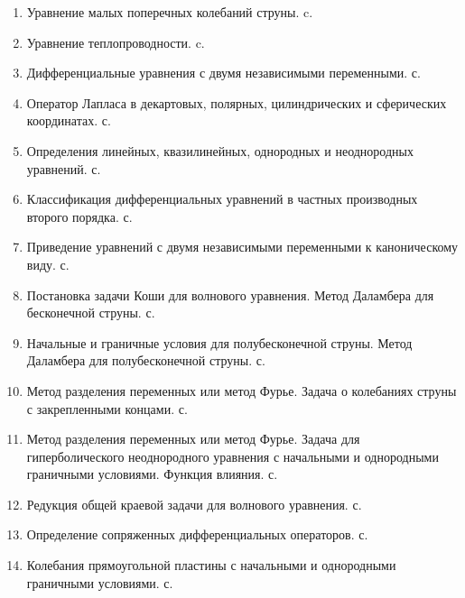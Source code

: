 
\begin{enumerate}
\setlength\parsep{0ex} 
\setlength\itemsep{0ex} \small
\item Уравнение малых поперечных колебаний струны. c.~\pageref{que:1}\\
\item Уравнение теплопроводности. c.~\pageref{que:2}\\
\item Дифференциальные уравнения с двумя независимыми переменными. с.~\pageref{que:3}\\
\item Оператор Лапласа в декартовых, полярных, цилиндрических и сферических координатах. с.~\pageref{que:4}\\
\item Определения линейных, квазилинейных, однородных и неоднородных уравнений. с.~\pageref{que:5}\\
\item Классификация дифференциальных уравнений в частных производных второго порядка. с.~\pageref{que:6}\\
\item Приведение уравнений с двумя независимыми переменными к каноническому виду. с.~\pageref{que:7}\\
\item Постановка задачи Коши для волнового уравнения. Метод Даламбера для бесконечной струны. с.~\pageref{que:8}\\
\item Начальные и граничные условия для полубесконечной струны. Метод Даламбера для полубесконечной струны. с.~\pageref{que:9}\\
\item Метод разделения переменных или метод Фурье. Задача о колебаниях струны с закрепленными концами. с.~\pageref{que:10}\\
\item Метод разделения переменных или метод Фурье. Задача для гиперболического неоднородного уравнения с начальными и однородными граничными условиями. Функция влияния. с.~\pageref{que:11}\\
\item Редукция общей краевой задачи для волнового уравнения. с.~\pageref{que:12}\\
\item Определение сопряженных дифференциальных операторов. с.~\pageref{que:13}\\
\item Колебания прямоугольной пластины с начальными и однородными граничными условиями. с.~\pageref{que:14}\\

\end{enumerate}
